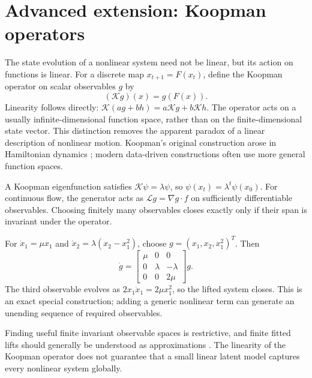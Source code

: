 \section{Advanced extension: Koopman operators}
The state evolution of a nonlinear system need not be linear, but its action on functions is linear. For a discrete map $x_{t+1}=F(x_t)$, define the Koopman operator on scalar observables $g$ by
\begin{equation}\label{eq:koopman}
(\mathcal K g)(x)=g(F(x)).
\end{equation}
Linearity follows directly: $\mathcal K(ag+bh)=a\mathcal Kg+b\mathcal Kh$. The operator acts on a usually infinite-dimensional function space, rather than on the finite-dimensional state vector. This distinction removes the apparent paradox of a linear description of nonlinear motion. Koopman's original construction arose in Hamiltonian dynamics \citep{koopman1931}; modern data-driven constructions often use more general function spaces.

A Koopman eigenfunction satisfies $\mathcal K\psi=\lambda\psi$, so $\psi(x_t)=\lambda^t\psi(x_0)$. For continuous flow, the generator acts as $\mathcal Lg=\nabla g\cdot f$ on sufficiently differentiable observables. Choosing finitely many observables closes exactly only if their span is invariant under the operator.

\begin{example}
For
$\dot x_1=\mu x_1$ and $\dot x_2=\lambda(x_2-x_1^2)$,
choose $g=(x_1,x_2,x_1^2)^T$. Then
\begin{equation}
\dot g=\begin{bmatrix}\mu&0&0\\0&\lambda&-\lambda\\0&0&2\mu\end{bmatrix}g.
\end{equation}
The third observable evolves as $2x_1\dot x_1=2\mu x_1^2$, so the lifted system closes. This is an exact special construction; adding a generic nonlinear term can generate an unending sequence of required observables.
\end{example}
Finding useful finite invariant observable spaces is restrictive, and finite fitted lifts should generally be understood as approximations \citep{brunton2016koopman}. The linearity of the Koopman operator does not guarantee that a small linear latent model captures every nonlinear system globally.

